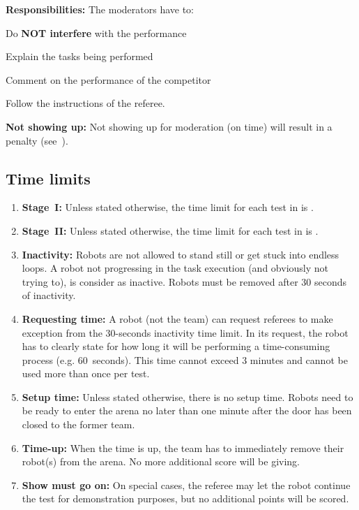 \noindent\textbf{Responsibilities:} The moderators have to:
\begin{compactitem}
	\item Do \textbf{NOT interfere} with the performance
	\item Explain the tasks being performed
	\item Comment on the performance of the competitor
	\item Follow the instructions of the referee.
\end{compactitem}

\noindent \textbf{Not showing up:} Not showing up for moderation (on time) will result in a penalty (see~).


\subsection{Time limits}
\label{rule:time_limits}
\begin{enumerate}
	\item \textbf{Stage~I:} Unless stated otherwise, the time limit for each test in  is .

	\item \textbf{Stage~II:} Unless stated otherwise, the time limit for each test in  is .

	\item \textbf{Inactivity:} Robots are not allowed to stand still or get stuck into endless loops.
	A robot not progressing in the task execution (and obviously not trying to), is consider as inactive.
	Robots must be removed after 30 seconds of inactivity.

	\item \textbf{Requesting time:} A robot (not the team) can request referees to make exception from the 30-seconds inactivity time limit.
	In its request, the robot has to clearly state for how long it will be performing a time-consuming process (e.g. 60~seconds).
	This time cannot exceed 3 minutes and cannot be used more than once per test.

	\item \textbf{Setup time:} Unless stated otherwise, there is no setup time.
	Robots need to be ready to enter the arena no later than one minute after the door has been closed to the former team.

	\item \textbf{Time-up:} When the time is up, the team has to immediately remove their robot(s) from the arena.
	No more additional score will be giving.

	\item \textbf{Show must go on:} On special cases, the referee may let the robot continue the test for demonstration purposes, but no additional points will be scored.
\end{enumerate}



